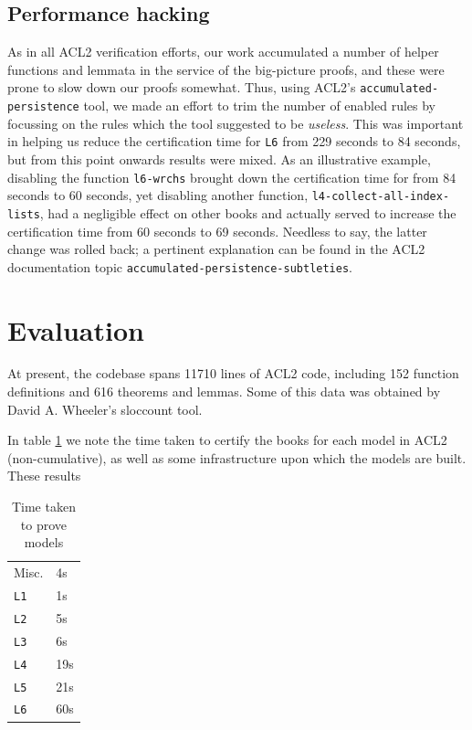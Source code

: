 \documentclass[runningheads,a4paper]{llncs}
\begin{document}
\subsection{Performance hacking}

As in all ACL2 verification efforts, our work accumulated a number of
helper functions and lemmata in the service of the big-picture proofs,
and these were prone to slow down our proofs somewhat. Thus, using
ACL2's \texttt{accumulated-persistence} tool, we made an effort to
trim the number of enabled rules by focussing on the rules which the
tool suggested to be \textit{useless}. This was important in helping us reduce
the certification time for \texttt{L6} from 229 seconds to 84 seconds,
but from this point onwards results were mixed. As an illustrative
example, disabling the function \texttt{l6-wrchs} brought down the
certification time for  from 84 seconds to 60 seconds, yet
disabling another function, \texttt{l4-collect-all-index-lists}, had a
negligible effect on other books and actually served to increase the
certification time from 60 seconds to 69 seconds. Needless to say, the
latter change was rolled back; a pertinent explanation can be found in
the ACL2 documentation topic \texttt{accumulated-persistence-subtleties}.


\section{Evaluation}
At present, the codebase spans 11710 lines of ACL2 code, including 152
function definitions and 616 theorems and lemmas. Some of this data was
obtained by David A. Wheeler's sloccount tool.

In table \ref{certification-timing-table} we note the time taken to certify
the books for each model in ACL2 (non-cumulative), as well as some
infrastructure upon which the models are built. These results 

\begin{table}[]
  \centering
  \caption{Time taken to prove models}
  \label{certification-timing-table}
  \begin{tabular}{ll}
    Misc. & 4s \\
    \texttt{L1} & 1s \\
    \texttt{L2} & 5s \\
    \texttt{L3} & 6s \\
    \texttt{L4} & 19s \\
    \texttt{L5} & 21s \\
    \texttt{L6} & 60s \\
  \end{tabular}
\end{table}
\end{document}
